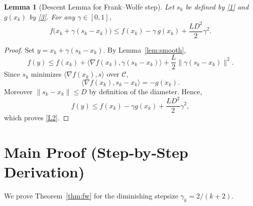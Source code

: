 \documentclass{article}
\newtheorem{lemma}{Lemma}
\begin{document}
\begin{lemma}[Descent Lemma for Frank–Wolfe step]
\label{lem:descent}
Let $s_k$ be defined by \eqref{1} and $g(x_k)$ by \eqref{3}. For any $\gamma\in[0,1]$,
\[
f\big(x_k+\gamma(s_k-x_k)\big)
\le
f(x_k)-\gamma\,g(x_k)+\frac{L D^{2}}{2}\gamma^{2}.
\tag{L2}
\]
\end{lemma}
\begin{proof}
Set $y=x_k+\gamma(s_k-x_k)$. By Lemma~\ref{lem:smooth},
\[
f(y)\le f(x_k)+\langle\nabla f(x_k),\gamma(s_k-x_k)\rangle+\frac{L}{2}\|\gamma(s_k-x_k)\|^{2}.
\]
Since $s_k$ minimizes $\langle\nabla f(x_k),s\rangle$ over $\mathcal{C}$,
\[
\langle\nabla f(x_k),s_k-x_k\rangle=-g(x_k).
\]
Moreover $\|s_k-x_k\|\le D$ by definition of the diameter. Hence,
\[
f(y)\le f(x_k)-\gamma g(x_k)+\frac{L D^{2}}{2}\gamma^{2},
\]
which proves \eqref{L2}. \qedhere
\]
\end{proof}

\section*{Main Proof (Step‑by‑Step Derivation)}
We prove Theorem~\ref{thm:fw} for the diminishing stepsize $\gamma_k=2/(k+2)$.  
\end{document}
